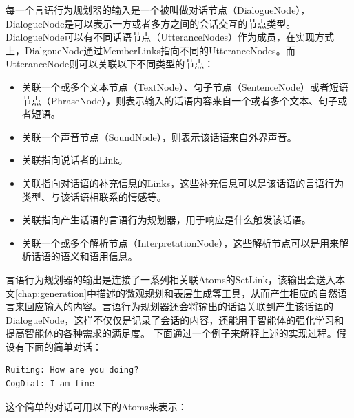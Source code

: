 每一个言语行为规划器的输入是一个被叫做对话节点（DialogueNode），DialogueNode是可以表示一方或者多方之间的会话交互的节点类型。DialogueNode可以有不同话语节点（UtteranceNodes）作为成员，在实现方式上，DialgoueNode通过MemberLinks指向不同的UtteranceNodes。而UtteranceNode则可以关联以下不同类型的节点：
\begin{itemize}
\item 关联一个或多个文本节点（TextNode）、句子节点（SentenceNode）或者短语节点（PhraseNode），则表示输入的话语内容来自一个或者多个文本、句子或者短语。
\item  关联一个声音节点（SoundNode），则表示该话语来自外界声音。
\item  关联指向说话者的Link。
\item  关联指向对话语的补充信息的Links，这些补充信息可以是该话语的言语行为类型、与该话语相联系的情感等。
\item  关联指向产生话语的言语行为规划器，用于响应是什么触发该话语。
\item  关联一个或多个解析节点（InterpretationNode），这些解析节点可以是用来解析话语的语义和语用信息。
\end{itemize}

言语行为规划器的输出是连接了一系列相关联Atoms的SetLink，该输出会送入本文\ref{chap:generation}中描述的微观规划和表层生成等工具，从而产生相应的自然语言来回应输入的内容。言语行为规划器还会将输出的话语关联到产生该话语的DialogueNode，这样不仅仅是记录了会话的内容，还能用于智能体的强化学习和提高智能体的各种需求的满足度。
下面通过一个例子来解释上述的实现过程。假设有下面的简单对话：
\begin{verbatim}
Ruiting: How are you doing?
CogDial: I am fine
\end{verbatim}
这个简单的对话可用以下的Atoms来表示：


